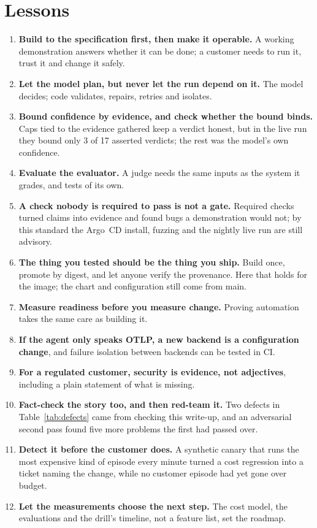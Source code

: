 \documentclass[11pt]{article}
\begin{document}
\section{Lessons}\label{sec:lessons}
\begin{enumerate}[leftmargin=*]
  \item \textbf{Build to the specification first, then make it operable.} A working demonstration answers whether it can be done; a customer needs to run it, trust it and change it safely.
  \item \textbf{Let the model plan, but never let the run depend on it.} The model decides; code validates, repairs, retries and isolates.
  \item \textbf{Bound confidence by evidence, and check whether the bound binds.} Caps tied to the evidence gathered keep a verdict honest, but in the live run they bound only 3 of 17 asserted verdicts; the rest was the model's own confidence.
  \item \textbf{Evaluate the evaluator.} A judge needs the same inputs as the system it grades, and tests of its own.
  \item \textbf{A check nobody is required to pass is not a gate.} Required checks turned claims into evidence and found bugs a demonstration would not; by this standard the Argo~CD install, fuzzing and the nightly live run are still advisory.
  \item \textbf{The thing you tested should be the thing you ship.} Build once, promote by digest, and let anyone verify the provenance. Here that holds for the image; the chart and configuration still come from main.
  \item \textbf{Measure readiness before you measure change.} Proving automation takes the same care as building it.
  \item \textbf{If the agent only speaks OTLP, a new backend is a configuration change}, and failure isolation between backends can be tested in CI.
  \item \textbf{For a regulated customer, security is evidence, not adjectives}, including a plain statement of what is missing.
  \item \textbf{Fact-check the story too, and then red-team it.} Two defects in Table~\ref{tab:defects} came from checking this write-up, and an adversarial second pass found five more problems the first had passed over.
  \item \textbf{Detect it before the customer does.} A synthetic canary that runs the most expensive kind of episode every minute turned a cost regression into a ticket naming the change, while no customer episode had yet gone over budget.
  \item \textbf{Let the measurements choose the next step.} The cost model, the evaluations and the drill's timeline, not a feature list, set the roadmap.
\end{enumerate}
\end{document}
